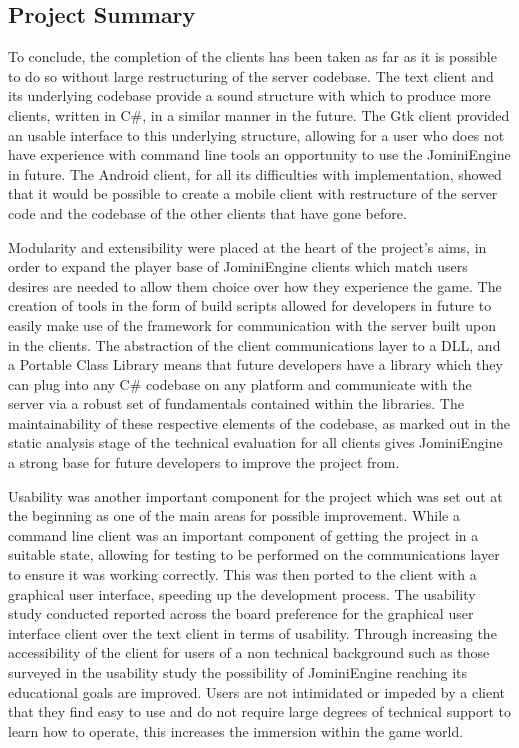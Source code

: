 \documentclass{article}
\begin{document}
\subsection{Project Summary}
To conclude, the completion of the clients has been taken as far as it is possible to do so without large restructuring of the server codebase. The text client and its underlying codebase provide a sound structure with which to produce more clients, written in C\#, in a similar manner in the future. The Gtk client provided an usable interface to this underlying structure, allowing for a user who does not have experience with command line tools an opportunity to use the JominiEngine in future. The Android client, for all its difficulties with implementation, showed that it would be possible to create a mobile client with restructure of the server code and the codebase of the other clients that have gone before.

Modularity and extensibility were placed at the heart of the project’s aims, in order to expand the player base of JominiEngine clients which match users desires are needed to allow them choice over how they experience the game. The creation of tools in the form of build scripts allowed for developers in future to easily make use of the framework for communication with the server built upon in the clients. The abstraction of the client communications layer to a DLL, and a Portable Class Library means that future developers have a library which they can plug into any C\# codebase on any platform and communicate with the server via a robust set of fundamentals contained within the libraries. The maintainability of these respective elements of the codebase, as marked out in the static analysis stage of the technical evaluation for all clients gives JominiEngine a strong base for future developers to improve the project from.

Usability was another important component for the project which was set out at the beginning as one of the main areas for possible improvement. While a command line client was an important component of getting the project in a suitable state, allowing for testing to be performed on the communications layer to ensure it was working correctly. This was then ported to the client with a graphical user interface, speeding up the development process. The usability study conducted reported across the board preference for the graphical user interface client over the text client in terms of usability. Through increasing the accessibility of the client for users of a non technical background such as those surveyed in the usability study the possibility of JominiEngine reaching its educational goals are improved. Users are not intimidated or impeded by a client that they find easy to use and do not require large degrees of technical support to learn how to operate, this increases the immersion within the game world.
\end{document}
